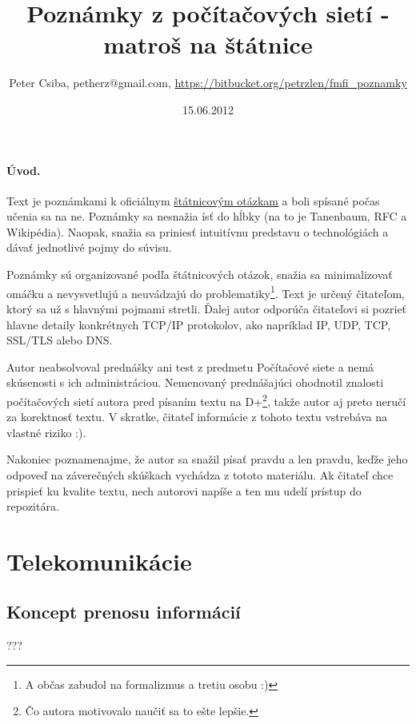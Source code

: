 \documentclass[10pt,a4paper]{article}
\title{Poznámky z počítačových sietí - matroš na štátnice}
\date{15.06.2012}
\author{Peter Csiba, petherz@gmail.com, \url{https://bitbucket.org/petrzlen/fmfi_poznamky}}
\begin{document}
\maketitle
\tableofcontents

\clearpage

\paragraph{Úvod.}   

Text je poznámkami k oficiálnym \href{http://new.dcs.fmph.uniba.sk/index.php/Studium/Bakalarske/StatneSkusky}{štátnicovým otázkam} a boli spísané počas učenia sa na ne.
Poznámky sa nesnažia ísť do hĺbky (na to je Tanenbaum, RFC a Wikipédia). Naopak, snažia sa priniesť intuitívnu predstavu o technológiách a dávať jednotlivé pojmy do súvisu. 

Poznámky sú organizované podľa štátnicových otázok, snažia sa minimalizovať omáčku a nevysvetlujú a neuvádzajú do problematiky\footnote{
A občas zabudol na formalizmus a tretiu osobu :) 
}. Text je určený čitateľom, ktorý sa už s hlavnými pojmami stretli.
Ďalej autor odporúča čitateľovi si pozrieť hlavne detaily konkrétnych TCP/IP protokolov, ako napríklad IP, UDP, TCP, SSL/TLS alebo DNS. 

Autor neabsolvoval prednášky ani test z predmetu Počítačové siete a nemá skúsenosti s ich administráciou. Nemenovaný prednášajúci ohodnotil znalosti počítačových sietí autora pred písaním textu na D+\footnote{
Čo autora motivovalo naučiť sa to ešte lepšie. 
}, takže autor aj preto neručí za korektnosť textu. V skratke, čitateľ informácie z tohoto textu vstrebáva na vlastné riziko :).

Nakoniec poznamenajme, že autor sa snažil písať pravdu a len pravdu, keďže jeho odpoveď na záverečných skúškach vychádza z tototo materiálu. 
Ak čitateľ chce prispieť ku kvalite textu, nech autorovi napíše a ten mu udelí prístup do repozitára. 

\section{Telekomunikácie}           
\subsection{Koncept prenosu informácií} 
???
\end{document}
